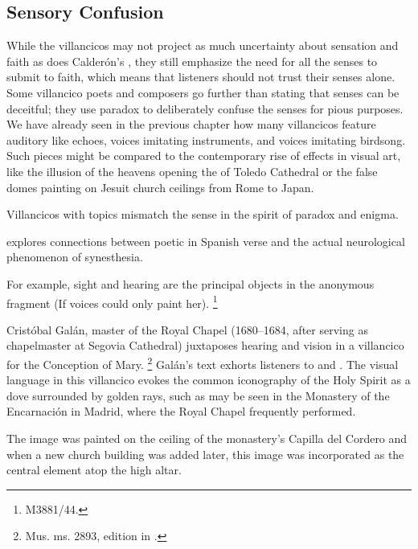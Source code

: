 \subsection{Sensory Confusion}

While the  villancicos may not project as much uncertainty about sensation and faith as does Calderón's , they still emphasize the need for all the senses to submit to faith, which means that listeners should not trust their senses alone.
Some villancico poets and composers go further than stating that senses can be deceitful; they use paradox to deliberately confuse the senses for pious purposes.
We have already seen in the previous chapter how many villancicos feature auditory  like echoes, voices imitating instruments, and voices imitating birdsong.
Such pieces might be compared to the contemporary rise of  effects in visual art, like the illusion of the heavens opening the  of Toledo Cathedral or the false domes painting on Jesuit church ceilings from Rome to Japan.%
    \Autocite[\XXX + illusion in Baroque art]{Bailey:Art}

Villancicos with  topics mismatch the sense in the spirit of paradox and enigma.%
\begin{Footnote}
    \Autocite{DoetschKraus:Sinestesia} explores connections between poetic  in Spanish verse and the actual neurological phenomenon of synesthesia.
\end{Footnote}
For example, sight and hearing are the principal objects in the anonymous fragment  (If voices could only paint her).%
\footnote{\signature{E-Mn}{M3881/44}.}

Cristóbal Galán, master of the Royal Chapel (1680--1684, after serving as chapelmaster at Segovia Cathedral) juxtaposes hearing and vision in a villancico for the Conception of Mary.%
\footnote{\signature{D-Mbs}{Mus. ms. 2893}, edition in \autocite[567--568]{CaberoPueyo:PhD}.}
Galán's text exhorts listeners to  and .
The visual language in this villancico evokes the common iconography of the Holy Spirit as a dove surrounded by golden rays, such as may be seen in the Monastery of the Encarnación in Madrid, where the Royal Chapel frequently performed.%
\begin{Footnote}
    The image was painted on the ceiling of the monastery's Capilla del Cordero and when a new church building was added later, this image was incorporated as the central element atop the high altar.%
    \Autocite[69--70, 81]{Sanz:GuiaDescalzasEncarnacion}
\end{Footnote}

